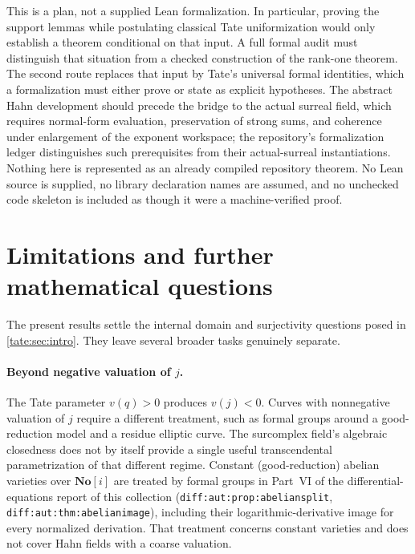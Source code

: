 \documentclass[11pt,letterpaper]{article}
\theoremstyle{definition}
\newcommand{\No}{\mathbf{No}}
\begin{document}
This is a plan, not a supplied Lean formalization. In particular, proving
the support lemmas while postulating classical Tate uniformization would
only establish a theorem conditional on that input. A full formal audit
must distinguish that situation from a checked construction of the
rank-one theorem. The second route replaces that input by Tate's universal
formal identities, which a formalization must either prove or state as
explicit hypotheses. The abstract Hahn development should precede the bridge
to the actual surreal field, which requires normal-form evaluation,
preservation of strong sums, and coherence under enlargement of the exponent
workspace; the repository's formalization ledger distinguishes such
prerequisites from their actual-surreal instantiations. Nothing here is
represented as an already compiled repository theorem. No Lean source is
supplied, no library declaration names are assumed, and no unchecked code
skeleton is included as though it were a machine-verified proof.

\section{Limitations and further mathematical questions}\label{tate:sec:limits}

The present results settle the internal domain and surjectivity questions
posed in \cref{tate:sec:intro}. They leave several broader tasks genuinely
separate.

\paragraph{Beyond negative valuation of $j$.}
The Tate parameter $v(q)>0$ produces $v(j)<0$. Curves with nonnegative
valuation of $j$ require a different treatment, such as formal groups
around a good-reduction model and a residue elliptic curve. The
surcomplex field's algebraic closedness does not by itself provide a
single useful transcendental parametrization of that different regime.
Constant (good-reduction) abelian varieties over $\No[i]$ are treated by
formal groups in Part~VI of the differential-equations report of this
collection (\texttt{diff:aut:prop:abeliansplit},
\texttt{diff:aut:thm:abelianimage}), including their logarithmic-derivative
image for every normalized derivation. That treatment concerns constant
varieties and does not cover Hahn fields with a coarse valuation.
\end{document}
